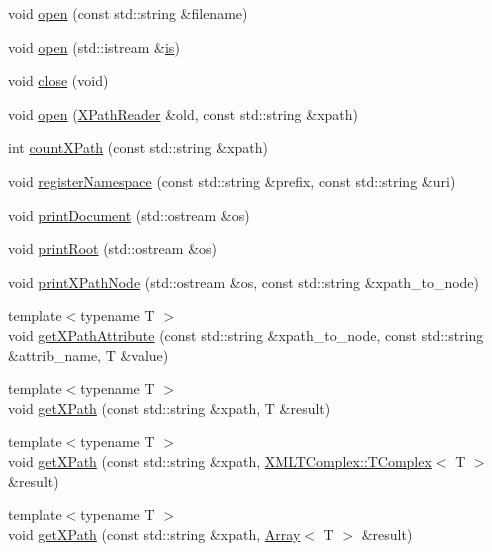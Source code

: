 \begin{DoxyCompactItemize}
\item 
void \mbox{\hyperlink{classXMLXPathReader_1_1XPathReader_aa6e237582bcd20389d60cb29a879890c}{open}} (const std\+::string \&filename)
\item 
void \mbox{\hyperlink{classXMLXPathReader_1_1XPathReader_aa9a57010ee8e71ac43da4388d622fe32}{open}} (std\+::istream \&\mbox{\hyperlink{x_8cc_a81abbbdef81e25584a2eab888e643d3d}{is}})
\item 
void \mbox{\hyperlink{classXMLXPathReader_1_1XPathReader_a2b6cfab8c9771da838a2bca6c9f23cb9}{close}} (void)
\item 
void \mbox{\hyperlink{classXMLXPathReader_1_1XPathReader_a55e38b40f720bb3622e3489561b1457c}{open}} (\mbox{\hyperlink{classXMLXPathReader_1_1XPathReader}{X\+Path\+Reader}} \&old, const std\+::string \&xpath)
\item 
int \mbox{\hyperlink{classXMLXPathReader_1_1XPathReader_a9fd76703ea5321a4666ca9a0c07a222a}{count\+X\+Path}} (const std\+::string \&xpath)
\item 
void \mbox{\hyperlink{classXMLXPathReader_1_1XPathReader_a4df21ae718977be11eb5669002522ebb}{register\+Namespace}} (const std\+::string \&prefix, const std\+::string \&uri)
\item 
void \mbox{\hyperlink{classXMLXPathReader_1_1XPathReader_a5505bd1ad902828907e2562947719fef}{print\+Document}} (std\+::ostream \&os)
\item 
void \mbox{\hyperlink{classXMLXPathReader_1_1XPathReader_a9634a8955fc1b2c8bc086b95f7fa2c1f}{print\+Root}} (std\+::ostream \&os)
\item 
void \mbox{\hyperlink{classXMLXPathReader_1_1XPathReader_a8f751fb071319179252a48075239559c}{print\+X\+Path\+Node}} (std\+::ostream \&os, const std\+::string \&xpath\+\_\+to\+\_\+node)
\item 
{\footnotesize template$<$typename T $>$ }\\void \mbox{\hyperlink{classXMLXPathReader_1_1XPathReader_a0a5ca67826c2c8fdad784a3bbbba4b3c}{get\+X\+Path\+Attribute}} (const std\+::string \&xpath\+\_\+to\+\_\+node, const std\+::string \&attrib\+\_\+name, T \&value)
\item 
{\footnotesize template$<$typename T $>$ }\\void \mbox{\hyperlink{classXMLXPathReader_1_1XPathReader_abbd673bc00e75502126b2cca246ff6f4}{get\+X\+Path}} (const std\+::string \&xpath, T \&result)
\item 
{\footnotesize template$<$typename T $>$ }\\void \mbox{\hyperlink{classXMLXPathReader_1_1XPathReader_a82579390a7b37879a7a7d9b79934a592}{get\+X\+Path}} (const std\+::string \&xpath, \mbox{\hyperlink{classXMLTComplex_1_1TComplex}{X\+M\+L\+T\+Complex\+::\+T\+Complex}}$<$ T $>$ \&result)
\item 
{\footnotesize template$<$typename T $>$ }\\void \mbox{\hyperlink{classXMLXPathReader_1_1XPathReader_a2c16b804ab7842a5bab7a8fe3f433437}{get\+X\+Path}} (const std\+::string \&xpath, \mbox{\hyperlink{classXMLArray_1_1Array}{Array}}$<$ T $>$ \&result)
\end{DoxyCompactItemize}


